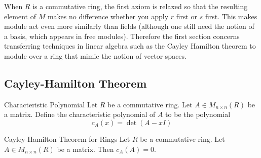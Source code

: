 \documentclass[a4paper]{article}
\begin{document}
When $R$ is a commutative ring, the first axiom is relaxed so that the resulting element of $M$ makes no difference whether you apply $r$ first or $s$ first. This makes module act even more similarly than fields (although one still need the notion of a basis, which appears in free modules). Therefore the first section concerns transferring techniques in linear algebra such as the Cayley Hamilton theorem to module over a ring that mimic the notion of vector spaces. 

\subsection{Cayley-Hamilton Theorem}
\begin{defn}{Characteristic Polynomial}{} Let $R$ be a commutative ring. Let $A\in M_{n\times n}(R)$ be a matrix. Define the characteristic polynomial of $A$ to be the polynomial $$c_A(x)=\det(A-xI)$$
\end{defn}

\begin{thm}{Cayley-Hamilton Theorem for Rings}{} Let $R$ be a commutative ring. Let $A\in M_{n\times n}(R)$ be a matrix. Then $c_A(A)=0$. 
\end{thm}
\end{document}
